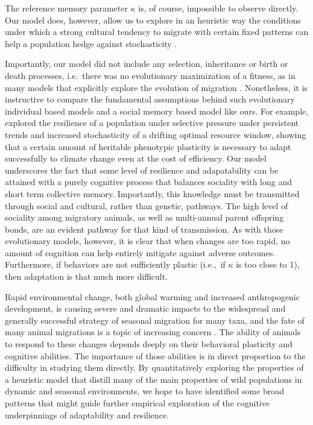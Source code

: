 \documentclass[utf8]{frontiersSCNS} %
\begin{document}
The reference memory parameter $\kappa$ is, of course, impossible to observe directly. Our model does, however, allow us to explore in an heuristic way the conditions under which a strong cultural tendency to migrate with certain fixed patterns can help a population hedge against stochasticity \citep{Abrahms2019,Fagan2019b}. 

Importantly, our model did not include any selection, inheritance or birth or death processes, i.e.~there was no evolutionary maximization of a fitness, as in many models that explicitly explore the evolution of migration \citep[e.g.][]{Guttal2010, Shaw2013, Anderson2013}. Nonetheless, it is instructive to compare the fundamental assumptions behind such evolutionary individual based models and a social memory based model like ours. For example, \citet{Anderson2013} explored the resilience of a population under selective pressure under persistent trends and increased stochasticity of a drifting optimal resource window, showing that a certain amount of heritable phenotypic plasticity is necessary to adapt successfully to climate change even at the cost of efficiency. Our model underscores the fact that some level of resilience and adapatability can be attained with a purely cognitive process that balances sociality with long and short term collective memory. Importantly, this knowledge must be transmitted through social and cultural, rather than genetic, pathways.  The high level of sociality among migratory animals, as well as multi-annual parent offspring bonds, are an evident pathway for that kind of transmission.  As with those evolutionary models, however, it is clear that when changes are too rapid, no amount of cognition can help entirely mitigate against adverse outcomes. Furthermore, if behaviors are not sufficiently plastic (i.e.,~if $\kappa$ is too close to 1), then adaptation is that much more difficult.

Rapid environmental change, both global warming and increased anthropogenic development, is causing severe and dramatic impacts to the widespread and generally successful strategy of seasonal migration for many taxa, and the fate of many animal migrations is a topic of increasing concern \citep{Kauffman2021, Wilcove2008}. The ability of animals to respond to these changes depends deeply on their behavioral plasticity and cognitive abilities. The importance of those abilities is in direct proportion to the difficulty in studying them directly. By quantitatively exploring the properties of a heuristic model that distill many of the main properties of wild populations in dynamic and seasonal environments, we hope to have identified some broad patterns that might guide further empirical exploration of the cognitive underpinnings of adaptability and resilience.
\end{document}
